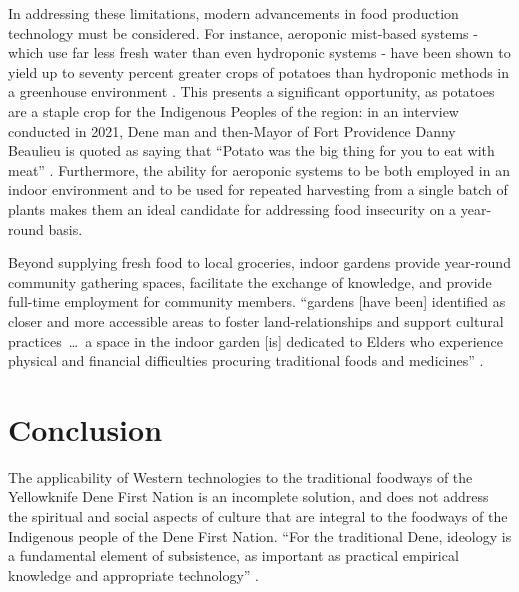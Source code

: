 \documentclass{report}
\begin{document}
\hspace{24pt} In addressing these limitations, modern advancements in food production technology must be considered. For instance, aeroponic mist-based systems - which use far less fresh water than even hydroponic systems - have been shown to yield up to seventy percent greater crops of potatoes than hydroponic methods in a greenhouse environment \parencite{aeroponicpotatoes}. This presents a significant opportunity, as potatoes are a staple crop for the Indigenous Peoples of the region: in an interview conducted in 2021, Dene man and then-Mayor of Fort Providence Danny Beaulieu is quoted as saying that ``Potato was the big thing for you to eat with meat'' \parencite[91]{resilientcommunities}. Furthermore, the ability for aeroponic systems to be both employed in an indoor environment and to be used for repeated harvesting from a single batch of plants makes them an ideal candidate for addressing food insecurity on a year-round basis.

\hspace{24pt}Beyond supplying fresh food to local groceries, indoor gardens provide year-round community gathering spaces, facilitate the exchange of knowledge, and provide full-time employment for community members. ``gardens [have been] identified as closer and more accessible areas to foster land-relationships and support cultural practices~\ldots~a space in the indoor garden [is] dedicated to Elders who experience physical and financial difficulties procuring traditional foods and medicines'' \parencite[99]{resilientcommunities}.


\section{Conclusion}

\hspace{24pt} The applicability of Western technologies to the traditional foodways of the Yellowknife Dene First Nation is an incomplete solution, and does not address the spiritual and social aspects of culture that are integral to the foodways of the Indigenous people of the Dene First Nation.
``For the traditional Dene, ideology is a fundamental element of subsistence, as important as practical empirical knowledge and appropriate technology'' \parencite[64]{lorecapturingtraditional}.
\end{document}

